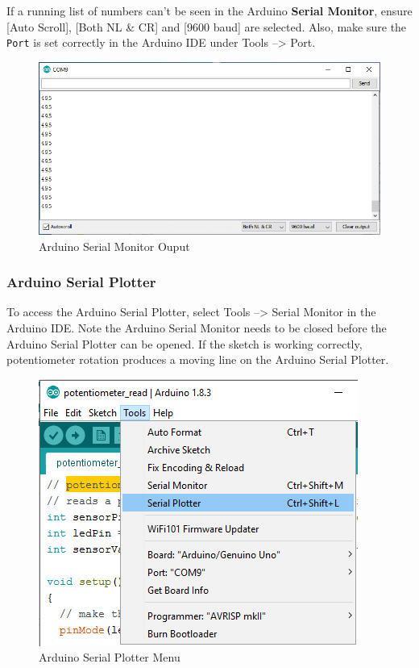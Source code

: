 \documentclass{book}
\makeatletter
\def\maxwidth{\ifdim\Gin@nat@width>\linewidth\linewidth
    \else\Gin@nat@width\fi}
\let\Oldincludegraphics\includegraphics
\renewcommand{\includegraphics}[1]{\Oldincludegraphics[width=.8\maxwidth]{#1}}
\makeatother
\begin{document}
If a running list of numbers can't be seen in the Arduino \textbf{Serial
Monitor}, ensure {[}Auto Scroll{]}, {[}Both NL \& CR{]} and {[}9600
baud{]} are selected. Also, make sure the \lstinline!Port! is set
correctly in the Arduino IDE under Tools --\textgreater{} Port.

\begin{figure}
\centering
\includegraphics{images/serial_monitor_output.png}
\caption{Arduino Serial Monitor Ouput}
\end{figure}
    




    
        \subsubsection{Arduino Serial Plotter}\label{arduino-serial-plotter}

To access the Arduino Serial Plotter, select Tools --\textgreater{}
Serial Monitor in the Arduino IDE. Note the Arduino Serial Monitor needs
to be closed before the Arduino Serial Plotter can be opened. If the
sketch is working correctly, potentiometer rotation produces a moving
line on the Arduino Serial Plotter.

\begin{figure}
\centering
\includegraphics{images/Tools_SerialPlotter.png}
\caption{Arduino Serial Plotter Menu}
\end{figure}
\end{document}
